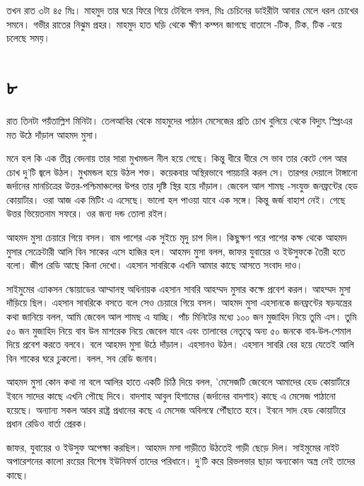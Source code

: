 \documentclass[
]{book}
\begin{document}
তখন রাত ৩টা ৪৫ মিঃ। মাহমুদ তার ঘরে ফিরে গিয়ে টেবিলে বসল, মিঃ চেচিনের ডাইরীটা আবার মেলে ধরল চোখের সমনে। গভীর রাতের নিঝুম প্রহর। মাহমুদ হাত ঘড়ি থেকে ক্ষীণ কম্পন জাগছে বাতাসে -টিক, টিক, টিক -বয়ে চলেছে সময়।

\section*{৮}\label{ota-1-8}

রাত তিনটা পয়ঁতাল্লিশ মিনিটা। তেলআবির থেকে মাহমুদের পাঠান মেসেজের প্রতি চোখ বুলিয়ে থেকে বিদ্যুৎ স্প্রিংএর মত উঠে দাঁড়াল আহমদ মুসা।

মনে হল কি এক তীব্র বেদনায় তার সারা মুখমন্ডল নীল হয়ে গেছে। কিন্তু ধীরে ধীরে সে ভাব তার কেটে গেল আর চোখ দু'টি জ্বলে উঠল। মুখমন্ডল হয়ে উঠল শক্ত। কয়েকবার অস্থিরভাবে পায়চারি করল সে। তারপর দেয়ালে টাঙ্গানো জর্দানের মানচিত্রের উত্তর-পশ্চিমাঞ্চলের উপর তার দৃষ্টি স্থির হয়ে দাঁড়াল। জেবেল আল শামছ -সংযুক্ত জনফ্রন্টের হেড কোয়ার্টার। ওরা আজ এক মিটিং এ এসেছে। ভালো হল পাওয়া যাবে এক সঙ্গে। কিন্তু জর্জ বাহাশ নেই। গেছে উত্তর ভিয়েতনাম সফরে। ওর জন্য দন্ড তোলা রইল।

আহমদ মুসা চেয়ারে গিয়ে বসল। বাম পাশের এক সুইচে মৃদু চাপ দিল। কিছুক্ষণ পরে পাশের কক্ষ থেকে আহমদ মুসার সেক্রেটারী আলি বিন সাকের এসে হাজির হল। আহমদ মুসা বলল, জাফর যুবায়ের ও ইউসুফকে তৈরী হতে বলো। জীপ রেডি আছে কিনা দেখো। এহসান সাবরিকে এখনি আমার কাছে আসতে সংবাদ দাও।

সাইমুমের এ্যাকসন স্কোয়াডের আম্মানস্থ অধিনায়ক এহসান সাবরি আহম্মদ মুসার কক্ষে প্রবেশ করল। আহম্মদ মুসা দাঁড়িয়ে ছিল। এহসান সাবরিকে বসতে বলে সেও চেয়ারে গিয়ে বসল। আহমদ মুসা এহসানকে জনফ্রন্টের ষড়যন্ত্রের কথা জানিয়ে বলল, আমি জেবেল আল শামছ এ যাচ্ছি। পাঁচ মিনিটের মধ্যে ১০০ জন মুজাহিদ নিয়ে তুমি এস। তুমি ৫০ জন মুজাহিদ নিয়ে বাব উল মাশরেক নিয়ে জেবেল যাবে এবং তালাবের নেতৃত্বে অন্য ৫০ জনকে বাব-উল-শেমাল দিয়ে প্রবেশ করতে বলবে। বলে আহমদ মুসা উঠে দাঁড়াল। এহসানও উঠল। এহসান সাবরি বের হয়ে যেতেই আলি বিন শাকের ঘরে ঢুকলো। বলল, সব রেডি জনাব।

আহমদ মুসা কোন কথা না বলে আলির হাতে একটি চিঠি দিয়ে বলল, 'মেসেজটি জেবেলে আমাদের হেড কোয়ার্টারে ইবনে সাদের কাছে এখনি পৌছে দিবে। বাদশাহ আবুল হিশামের (জর্দানের বাদশাহ) কাছে এ মেসেজ পাঠানো হয়েছে। অন্যান্য সকল আরব রাষ্ট্র প্রধানের কছে এ মেসেজ অবিলম্বে পৌঁছাতে হবে। ইবনে সাদ হেড কোয়ার্টারে প্রধান রেডিও বার্তা প্রেরক।

জাফর, যুবায়ের ও ইউসুফ অপেক্ষা করছিল। আহমদ মসা গাড়ীতে উঠতেই গাড়ী ছেড়ে দিল। সাইমুমের নাইট অপারেশনের কালো রংয়ের বিশেষ ইউনিফর্ম তাদের পরিধানে। দু'টি করে রিভলভার ছাড়া অন্যকোন অস্ত্র নেই তাদের কাছে।
\end{document}
